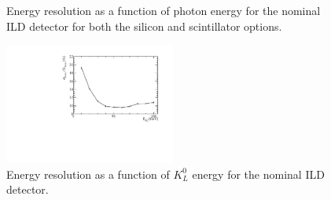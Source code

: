 \begin{figure}
\centering
{}
\caption[Energy resolution as a function of photon energy for the nominal ILD detector for both the silicon and scintillator options.]{Energy resolution as a function of photon energy for the nominal ILD detector for both the silicon and scintillator options.}
\label{fig:ecalnominalres}
\end{figure}

\begin{figure}
\centering
\includegraphics[width=0.5\textwidth]{OptimisationStudies/Plots/EnergyResolution/ER_vs_EKaon0L_SiECal.pdf}
\caption[Energy resolution as a function of $K^{0}_{L}$ energy for the nominal ILD detector.]{Energy resolution as a function of $K^{0}_{L}$ energy for the nominal ILD detector.}
\label{fig:hcalnominalres}
\end{figure} 

